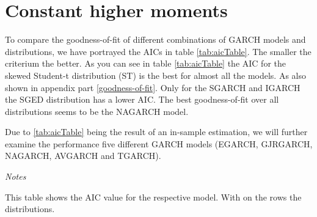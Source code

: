 \documentclass[a4paper, nobind]{templates/ociamthesis}
\begin{document}
\newpage

\hypertarget{constant-higher-moments}{%
\section{Constant higher moments}\label{constant-higher-moments}}

\noindent To compare the goodness-of-fit of different combinations of GARCH models and distributions, we have portrayed the AICs in table \ref{tab:aicTable}. The smaller the criterium the better. As you can see in table \ref{tab:aicTable} the AIC for the skewed Student-t distribution (ST) is the best for almost all the models. As also shown in appendix part \ref{goodness-of-fit}. Only for the SGARCH and IGARCH the SGED distribution has a lower AIC. The best goodness-of-fit over all distributions seems to be the NAGARCH model.

\noindent  Due to \ref{tab:aicTable} being the result of an in-sample estimation, we will further examine the performance five different GARCH models (EGARCH, GJRGARCH, NAGARCH, AVGARCH and TGARCH).

\begin{table}[h!]

\caption{\label{tab:aicTable}Model selection according to AIC}
\centering
\begin{threeparttable}
\begin{tablenotes}
\item \textit{Notes} 
\item This table shows the AIC value for the respective model. With on the rows the distributions. 
\end{tablenotes}
\end{threeparttable}
\end{table}
\end{document}
